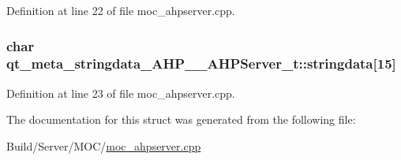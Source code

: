 Definition at line 22 of file moc\+\_\+ahpserver.\+cpp.

\hypertarget{structqt__meta__stringdata___a_h_p_____a_h_p_server__t_adc32c7e543926d74e2f151901602afc7}{}
\subsubsection[{stringdata}]{\setlength{\rightskip}{0pt plus 5cm}char qt\+\_\+meta\+\_\+stringdata\+\_\+\+A\+H\+P\+\_\+\+\_\+\+A\+H\+P\+Server\+\_\+t\+::stringdata\mbox{[}15\mbox{]}}\label{structqt__meta__stringdata___a_h_p_____a_h_p_server__t_adc32c7e543926d74e2f151901602afc7}


Definition at line 23 of file moc\+\_\+ahpserver.\+cpp.



The documentation for this struct was generated from the following file\+:\begin{DoxyCompactItemize}
\item 
Build/\+Server/\+M\+O\+C/\hyperlink{moc__ahpserver_8cpp}{moc\+\_\+ahpserver.\+cpp}\end{DoxyCompactItemize}
